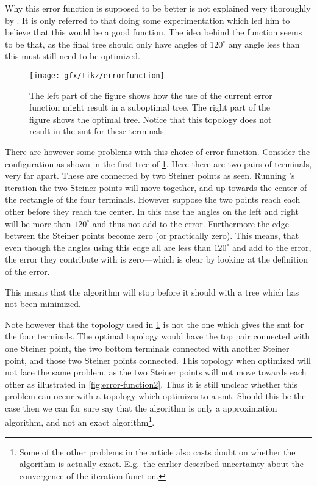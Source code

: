Why this error function is supposed to be better is not explained very
thoroughly by \citeauthor{smith1992}. It is only referred to that doing some
experimentation which led him to believe that this would be a good function. The
idea behind the function seems to be that, as the final tree should only have
angles of $120^{\circ}$ any angle less than this must still need to be
optimized.

\begin{figure}[htbp]
  \centering
  \texttt{[image: gfx/tikz/errorfunction]}
  \caption[Possible problem with the error function]{The left part of the figure
    shows how the use of the current error function might result in a suboptimal
    tree. The right part of the figure shows the optimal tree. Notice that
    this topology does not result in the \ac{smt} for these
    terminals.\label{fig:error-function}}
\end{figure}

There are however some problems with this choice of error function. Consider the
configuration as shown in the first tree of \cref{fig:error-function}. Here
there are two pairs of terminals, very far apart. These are connected by two
Steiner points as seen. Running \citeauthor{smith1992}'s iteration the two
Steiner points will move together, and up towards the center of the rectangle of
the four terminals. However suppose the two points reach each other before they
reach the center. In this case the angles on the left and right will be more
than $120^{\circ}$ and thus not add to the error. Furthermore the edge between
the Steiner points become zero (or practically zero). This means, that even
though the angles using this edge all are less than $120^{\circ}$ and add to the
error, the error they contribute with is zero---which is clear by looking at the
definition of the error.

This means that the algorithm will stop before it should with a tree which has
not been minimized.

Note however that the topology used in \cref{fig:error-function} is not the one
which gives the \ac{smt} for the four terminals. The optimal topology would have
the top pair connected with one Steiner point, the two bottom terminals
connected with another Steiner point, and those two Steiner points
connected. This topology when optimized will not face the same problem, as the
two Steiner points will not move towards each other as illustrated in
\cref{fig:error-function2}. Thus it is still unclear whether this problem can
occur with a topology which optimizes to a \ac{smt}.  Should this be the case
then we can for sure say that the algorithm is only a approximation algorithm,
and not an exact algorithm\footnote{Some of the other problems in the article
  also casts doubt on whether the algorithm is actually exact. E.g.\ the earlier
described uncertainty about the convergence of the iteration function.}.

